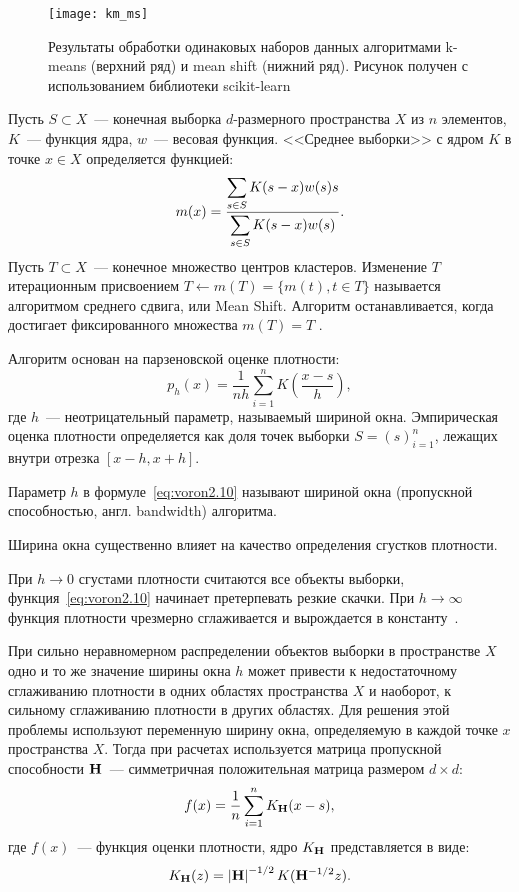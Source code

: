 \begin{figure}[h!]
    \centering
    \texttt{[image: km\_ms]}\\[1ex]
    \parbox{.9\textwidth}{\caption{Результаты обработки одинаковых наборов данных алгоритмами k-means (верхний ряд) и mean shift (нижний ряд). Рисунок получен с использованием библиотеки scikit-learn~\cite{sklearn}} \label{pic:km-ms}}
\end{figure}

Пусть \( S\subset X \)~--- конечная выборка \( d \)-размерного пространства \( X \) из \( n \) элементов, \( K \)~--- функция ядра, \( w \)~--- весовая функция. <<Среднее выборки>> с ядром \( K \) в точке \( x\in X \) определяется функцией:
\begin{equation}
    m(x) = \frac{\displaystyle\sum_{s\in S} K(s - x)w(s)s}{\displaystyle\sum_{s\in S} K(s - x)w(s)}.
    \label{eq:wiki-shift}
\end{equation}
Пусть \( T\subset X \)~--- конечное множество центров кластеров. Изменение \( T \) итерационным присвоением \( T\gets m(T) = \Big\{ m(t), t\in T\Big\} \) называется алгоритмом среднего сдвига, или Mean Shift. Алгоритм останавливается, когда достигает фиксированного множества \( m(T) = T \) \cite{meanshift}.

Алгоритм основан на парзеновской оценке плотности:
\begin{equation}
    p_h(x) = \frac{1}{nh}\sum_{i=1}^n K\left(\frac{x - s}{h}\right),
    \label{eq:voron2.10}
\end{equation}
где \( h \)~--- неотрицательный параметр, называемый шириной окна. Эмпирическая оценка плотности определяется как доля точек выборки \( S = (s)_{i=1}^n \), лежащих внутри отрезка \( [x - h, x + h] \).

Параметр \( h \) в формуле~\eqref{eq:voron2.10} называют шириной окна (пропускной способностью, англ. bandwidth) алгоритма.

Ширина окна существенно влияет на качество определения сгустков плотности.

При \( h\to 0 \) сгустами плотности считаются все объекты выборки, функция~\eqref{eq:voron2.10} начинает претерпевать резкие скачки. При \( h\to\infty \) функция плотности чрезмерно сглаживается и вырождается в константу~\cite{voron}.

При сильно неравномерном распределении объектов выборки в пространстве \( X \) одно и то же значение ширины окна \( h \) может привести к недостаточному сглаживанию плотности в одних областях пространства \( X \) и наоборот, к сильному сглаживанию плотности в других областях. Для решения этой проблемы используют переменную ширину окна, определяемую в каждой точке \( x \) пространства \( X \). Тогда при расчетах используется матрица пропускной способности \( \mathbf{H} \)~--- симметричная положительная матрица размером \( d\times d\):
\begin{equation}
    f(x) = \frac{1}{n}\sum_{i=1}^n K_{\mathbf{H}}(x - s),
    \label{eq:msrobust1}
\end{equation}
где \( f(x) \)~--- функция оценки плотности, ядро \( K_{\mathbf{H}} \) представляется в виде:
\[
    K_{\mathbf{H}}(z) = \left|\mathbf{H}\right|^{-1/2} K(\mathbf{H}^{-1/2}z).
\]

